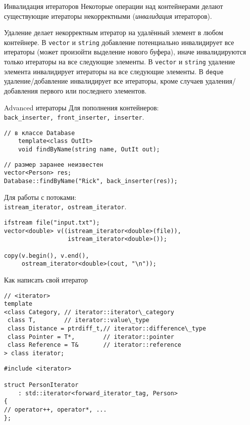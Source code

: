\documentclass[aspectration=1610,t]{beamer}
\begin{document}
\begin{frame}[fragile]{Инвалидация итераторов}
    Некоторые операции над контейнерами делают существующие итераторы
    некорректными (\emph{инвалидация} итераторов).
    \bigskip
    
    \begin{minipage}{.8\textwidth}
    \begin{enumerate}
        \pitem Удаление делает некорректным итератор на удалённый элемент в любом контейнере.
        \pitem В \texttt{vector} и \texttt{string}
            добавление потенциально инвалидирует все итераторы (может произойти выделение нового буфера), иначе инвалидируются только итераторы на все следующие элементы.
        \pitem В \texttt{vector} и \texttt{string} удаление элемента инвалидирует итераторы на все следующие элементы.
        \pitem В \texttt{deque} удаление/добавление инвалидирует все итераторы, кроме 
            случаев удаления/добавления первого или последнего элементов.
        
    \end{enumerate}
    \end{minipage}
\end{frame}
\begin{frame}[fragile]{Advanced итераторы}
Для пополнения контейнеров:\\
{\tt back\_inserter, front\_inserter, inserter}.
\begin{lstlisting}
// в классе Database
    template<class OutIt>
    void findByName(string name, OutIt out);
\end{lstlisting}
\begin{lstlisting}
// размер заранее неизвестен
vector<Person> res; 
Database::findByName("Rick", back_inserter(res));
\end{lstlisting}
Для работы с потоками: \\{\tt istream\_iterator, ostream\_iterator}.
\begin{lstlisting}
ifstream file("input.txt");
vector<double> v((istream_iterator<double>(file)), 
                  istream_iterator<double>());
    
copy(v.begin(), v.end(), 
     ostream_iterator<double>(cout, "\n"));
\end{lstlisting}
\end{frame}

\begin{frame}[fragile]{Как написать свой итератор}
\begin{lstlisting}
// <iterator>
template 
<class Category, // iterator::iterator\_category
 class T,        // iterator::value\_type
 class Distance = ptrdiff_t,// iterator::difference\_type
 class Pointer = T*,        // iterator::pointer
 class Reference = T&       // iterator::reference
> class iterator;
\end{lstlisting}

\begin{lstlisting}
#include <iterator>

struct PersonIterator 
    : std::iterator<forward_iterator_tag, Person>
{
// operator++, operator*, ... 
};
\end{lstlisting}
\end{frame}
\end{document}
